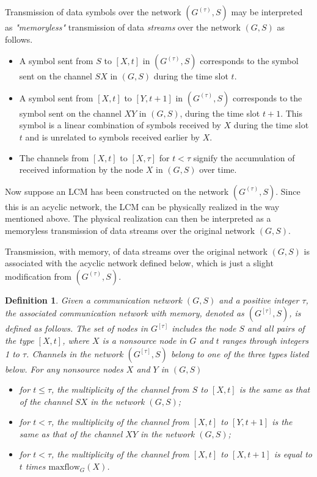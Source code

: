 \documentclass[journal]{IEEEtran}
\newtheorem*{defi}{Definition}
\begin{document}
\par
Transmission of data symbols over the network $(G^{(\tau)},S)$ may be interpreted as \emph{"memoryless"} transmission of data \emph{streams} over the network $(G,S)$ as follows.
\begin{itemize}
	\item[1)] A symbol sent from $S$ to $[X,t]$ in $(G^{(\tau)},S)$ corresponds to the symbol sent on the channel $SX$ in $(G,S)$ during the time slot $t$.
	\item[2)] A symbol sent from $[X,t]$ to $[Y,t+1]$ in $(G^{(\tau)},S)$ corresponds to the symbol sent on the channel $XY$ in $(G,S)$, during the time slot $t+1$. This symbol is a linear combination of symbols received by $X$ during the time slot $t$ and is unrelated to symbols received earlier by $X$.
	\item[3)] The channels from $[X,t]$ to $[X,\tau]$ for $t<\tau$ signify the accumulation of received information by the node $X$ in $(G,S)$ over time.
\end{itemize}
\par
Now suppose an LCM has been constructed on the network $(G^{(\tau)},S)$. Since this is an acyclic network, the LCM can be physically realized in the way mentioned above. The physical realization can then be interpreted as a memoryless transmission of data streams over the original network $(G,S)$.
\par
Transmission, with memory, of data streams over the original network $(G,S)$ is associated with the acyclic network defined below, which is just a slight modification from $(G^{(\tau)},S)$.
\begin{defi}
	Given a communication network $(G,S)$ and a positive integer $\tau$, the associated communication network with memory, denoted as $(G^{[\tau]},S)$, is defined as follows. The set of nodes in $G^{[\tau]}$ includes the node $S$ and all pairs of the type $[X,t]$, where  $X$ is a nonsource node in $G$ and $t$ ranges through integers 1 to $\tau$. Channels in the network $(G^{[\tau]},S)$ belong to one of the three types listed below. For any nonsource nodes $X$ and $Y$ in $(G,S)$
	\begin{itemize}
		\item[1)] for $t\leq \tau$, the multiplicity of the channel from $S$ to $[X,t]$ is the same as that of the channel $SX$ in the network $(G,S)$;
		\item[2)] for $t< \tau$, the multiplicity of the channel from $[X,t]$ to $[Y,t+1]$ is the same as that of the channel $XY$ in the network $(G,S)$;
		\item[3)] for $t< \tau$, the multiplicity of the channel from $[X,t]$ to $[X,t+1]$ is equal to $t$ times $\text{maxflow}_G(X)$.
	\end{itemize}
\end{defi}
\end{document}
